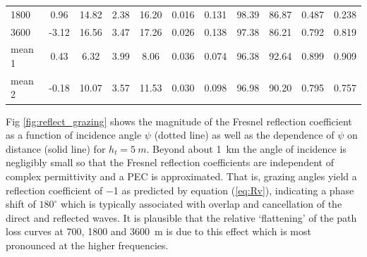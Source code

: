 \documentclass[10pt,journal,twoside]{IEEEtran}
\begin{document}
\begin{table}[!ht]
\begin{tabular*}{\linewidth}{ @{\extracolsep{\fill}} l*{10}c @{}}
        1800  & 0.96  & 14.82 & 2.38  & 16.20 & 0.016 & 0.131 & 98.39 & 86.87 & 0.487 & 0.238 \\
        3600  & -3.12 & 16.56 & 3.47  & 17.26 & 0.026 & 0.138 & 97.38 & 86.21 & 0.792 & 0.819 \\ \cmidrule{1-1} \cmidrule{2-3} \cmidrule{4-5} \cmidrule{6-7} \cmidrule{8-9} \cmidrule{10-11}
        mean 1 & 0.43  & 6.32  & 3.99  & 8.06  & 0.036 & 0.074 & 96.38 & 92.64 & 0.899 & 0.909 \\
        mean 2 & -0.18 & 10.07 & 3.57  & 11.53 & 0.030 & 0.098 & 96.98 & 90.20 & 0.795 & 0.757 \\
		\bottomrule
	\end{tabular*}%
\end{table}%
%

Fig \ref{fig:reflect_grazing} shows the magnitude of the Fresnel reflection coefficient as a function of incidence angle $\psi$ (dotted line) as well as the dependence of $\psi$ on distance (solid line) for $h_t=\SI{5}{m}$. Beyond about \SI{1}{km} the angle of incidence is negligibly small so that the Fresnel reflection coefficients are independent of complex permittivity and a PEC is approximated. That is, grazing angles yield a reflection coefficient of \num{-1} as predicted by equation (\ref{eq:Rv}), indicating a phase shift of $180^\circ$ which is typically associated with overlap and cancellation of the direct and reflected waves. It is plausible that the relative `flattening' of the path loss curves at \SI{700}{}, \SI{1800}{} and \SI{3600}{m} is due to this effect which is most pronounced at the higher frequencies. %
%
\end{document}
